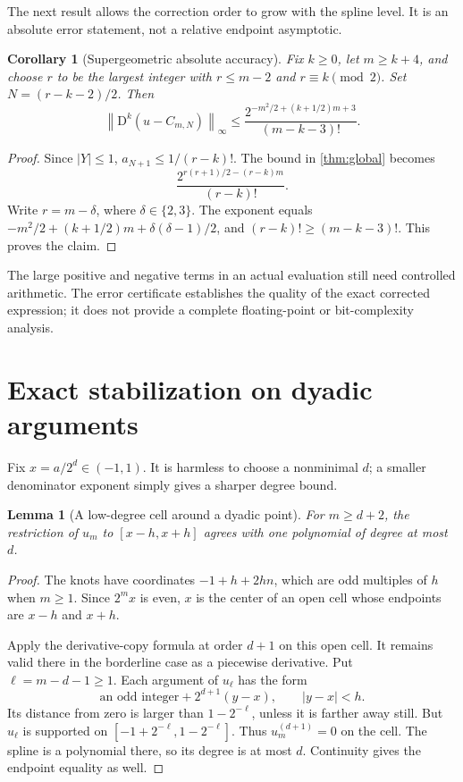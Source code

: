 \documentclass[11pt,a4paper]{article}
\numberwithin{equation}{section}
\newtheorem{lemma}[lemma]{Lemma}
\newtheorem{corollary}[corollary]{Corollary}
\theoremstyle{definition}
\newcommand{\D}{\mathrm D}
\newcommand{\norm}[1]{\left\lVert #1\right\rVert}
\begin{document}
The next result allows the correction order to grow with the spline
level. It is an absolute error statement, not a relative endpoint
asymptotic.

\begin{corollary}[Supergeometric absolute accuracy]\label{cor:growing}
Fix $k\geq0$, let $m\geq k+4$, and choose $r$ to be the largest integer
with $r\leq m-2$ and $r\equiv k\pmod2$. Set
$N=(r-k-2)/2$. Then
\begin{equation}
 \norm{\D^k(u-C_{m,N})}_\infty
 \leq \frac{2^{-m^2/2+(k+1/2)m+3}}{(m-k-3)!}.
 \label{eq:growing-bound}
\end{equation}
\end{corollary}
\begin{proof}
Since $|Y|\leq1$, $a_{N+1}\leq1/(r-k)!$. The bound in
\cref{thm:global} becomes
\begin{equation}
 \frac{2^{r(r+1)/2-(r-k)m}}{(r-k)!}.
\end{equation}
Write $r=m-\delta$, where $\delta\in\{2,3\}$. The exponent equals
$-m^2/2+(k+1/2)m+\delta(\delta-1)/2$, and
$(r-k)!\geq(m-k-3)!$. This proves the claim.
\end{proof}

The large positive and negative terms in an actual evaluation still
need controlled arithmetic. The error certificate establishes the
quality of the exact corrected expression; it does not provide a
complete floating-point or bit-complexity analysis.

\section{Exact stabilization on dyadic arguments}\label{sec:dyadic}

Fix $x=a/2^d\in(-1,1)$. It is harmless to choose a nonminimal $d$;
a smaller denominator exponent simply gives a sharper degree bound.

\begin{lemma}[A low-degree cell around a dyadic point]\label{lem:dyadic-cell}
For $m\geq d+2$, the restriction of $u_m$ to
$[x-h,x+h]$ agrees with one polynomial of degree at most $d$.
\end{lemma}
\begin{proof}
The knots have coordinates $-1+h+2hn$, which are odd multiples of
$h$ when $m\geq1$. Since $2^mx$ is even, $x$ is the center of an
open cell whose endpoints are $x-h$ and $x+h$.

Apply the derivative-copy formula at order $d+1$ on this open cell.
It remains valid there in the borderline case as a piecewise derivative.
Put $\ell=m-d-1\geq1$. Each argument of $u_\ell$ has the form
\begin{equation}
 \text{an odd integer}+2^{d+1}(y-x),\qquad |y-x|<h.
\end{equation}
Its distance from zero is larger than $1-2^{-\ell}$, unless it is
farther away still. But $u_\ell$ is supported on
$[-1+2^{-\ell},1-2^{-\ell}]$. Thus $u_m^{(d+1)}=0$ on the cell.
The spline is a polynomial there, so its degree is at most $d$.
Continuity gives the endpoint equality as well.
\end{proof}
\end{document}
